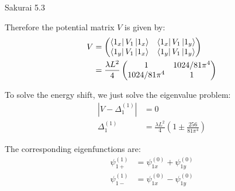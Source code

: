 \documentclass{article}
\begin{document}
\begin{section}{Sakurai 5.3}
\begin{tcolorbox}[breakable]
			Therefore the potential matrix $V$ is given by:
			\begin{align*}
				V &= \begin{pmatrix}
					\bra{1_x}V_1\ket{1_x} & \bra{1_x}V_1\ket{1_y} \\
					\bra{1_y}V_1\ket{1_x} & \bra{1_y}V_1\ket{1_y}
				\end{pmatrix} \\
				&= \frac{\lambda L^2}{4} \begin{pmatrix}
					1 & 1024/81\pi^4 \\
					1024/81\pi^4 & 1
				\end{pmatrix}
			\end{align*}

			To solve the energy shift, we just solve the eigenvalue problem:
			\begin{align*}
				|V - \Delta_1^{(1)}| &= 0 \\
				\Delta_1^{(1)} &= \frac{\lambda L^2}{4} \left( 1 \pm \frac{256}{81 \pi^4} \right)
			\end{align*}

			The corresponding eigenfunctions are:
			\begin{align*}
				\psi_{1+}^{(1)} &= \psi_{1x}^{(0)} + \psi_{1y}^{(0)} \\
				\psi_{1-}^{(1)} &= \psi_{1x}^{(0)} - \psi_{1y}^{(0)} 
			\end{align*}
		\end{tcolorbox}
	\end{section}
\end{document}
